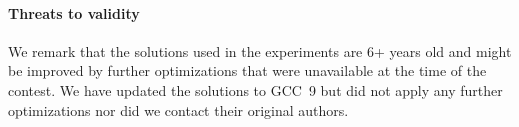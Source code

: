 



\paragraph{Threats to validity}
%
We remark that the solutions used in the experiments are 6+ years old and might be improved by further optimizations that were unavailable at the time of the contest.
We have updated the solutions to GCC~9 but did not apply any further optimizations nor did we contact their original authors.

